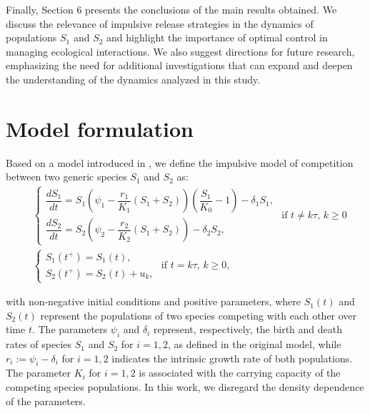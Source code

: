 \documentclass[10pt,letterpaper]{article}
\begin{document}
Finally, Section 6 presents the conclusions of the main results obtained. We discuss the relevance of impulsive release strategies in the dynamics of populations $S_1$ and $S_2$ and highlight the importance of optimal control in managing ecological interactions. We also suggest directions for future research, emphasizing the need for additional investigations that can expand and deepen the understanding of the dynamics analyzed in this study.





\section{Model formulation}
\label{sec:model}
Based on a model introduced in \cite{Campo2017}, we define the impulsive model of competition between two generic species $S_1$ and $S_2$ as: 
\begin{subequations}
\begin{align}
&\left.
\begin{cases}\label{eq:equation_1}
        \dfrac{dS_1}{dt}=S_1\left(\psi_1-\dfrac{r_1}{K_1}(S_1+S_2)\right)\left(\dfrac{S_1}{K_0} - 1 \right) - \delta_1 S_1,\\
        \dfrac{dS_2}{dt}=S_2\left(\psi_2-\dfrac{r_2}{K_2}(S_1+S_2)\right)-\delta_2S_2,
\end{cases}
\right.\text{ if } t \neq k\tau,\, k \geq 0\\
&\left.
\begin{cases}\label{eq:equation_2}  
        S_1(t^+)= S_1(t), \\
        S_2(t^+)= S_2(t) + u_k, 
\end{cases}
\right.\text{ if } t = k\tau,\, k \geq 0,
\end{align}
\end{subequations}

\noindent 
with non-negative initial conditions and positive parameters, where $S_1(t)$ and $S_2(t)$ represent the populations of two species competing with each other over time $t$. The parameters $\psi_i$ and $\delta_i$ represent, respectively, the birth and death rates of species $S_1$ and $S_2$ for $i  = 1, 2$, as defined in the original model, while $r_i:= \psi_i - \delta_i$ for $i = 1, 2$ indicates the intrinsic growth rate of both populations. The parameter $K_i$ for $i = 1, 2$ is associated with the carrying capacity of the competing species populations. In this work, we disregard the density dependence of the parameters.
\end{document}
